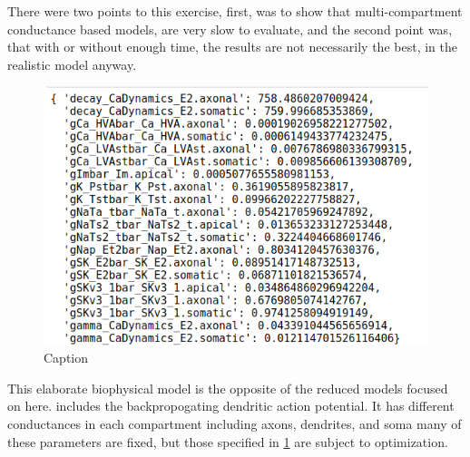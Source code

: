 There were two points to this exercise, first, was to show that multi-compartment conductance based models, are very slow to evaluate, and the second point was, that with or without enough time, the results are not necessarily the best, in the realistic model anyway.

\begin{figure}
    \centering
    \includegraphics{figures/parameters_opt_l5pc.png}
    \caption{Caption}
    \label{fig:parameters}
\end{figure}

This elaborate biophysical model is the opposite of the reduced models focused on here.  includes the backpropogating dendritic action potential. It has different conductances in each compartment including axons, dendrites, and soma many of these parameters are fixed, but those specified in \ref{fig:parameters} are subject to optimization.




